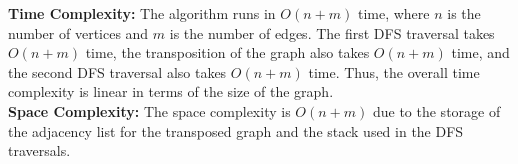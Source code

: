 \begin{algorithm}

    \textbf{Time Complexity:} The algorithm runs in $O(n + m)$ time, where $n$ is the number of vertices and $m$ is the number of edges. 
    The first DFS traversal takes $O(n + m)$ time, the transposition of the graph also takes $O(n + m)$ time, and the second DFS traversal also 
    takes $O(n + m)$ time. Thus, the overall time complexity is linear in terms of the size of the graph. \\
    
    \textbf{Space Complexity:} The space complexity is $O(n + m)$ due to the storage of the adjacency list for the transposed graph and the stack used in the 
    DFS traversals.
\end{algorithm}
